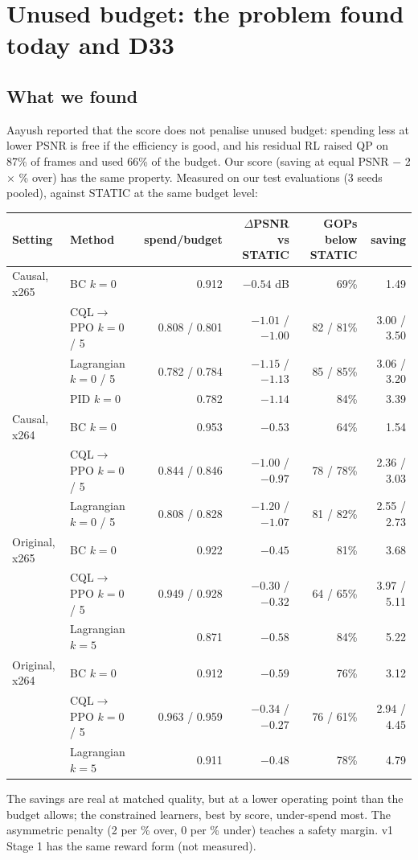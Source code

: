 \documentclass[10pt,a4paper]{article}
\begin{document}
\section{Unused budget: the problem found today and D33}\label{sec:under}
\subsection{What we found}
Aayush reported that the score does not penalise unused budget: spending less at lower PSNR is free if the
efficiency is good, and his residual RL raised QP on 87\% of frames and used 66\% of the budget. Our score (saving at
equal PSNR $-$ 2 $\times$ \% over) has the same property. Measured on our test evaluations (3 seeds pooled),
against STATIC at the same budget level:
\begin{center}\small
\begin{tabular}{llrrrr}
\toprule
Setting & Method & spend/budget & $\Delta$PSNR vs STATIC & GOPs below STATIC & saving \\\midrule
Causal, x265 & BC $k=0$ & 0.912 & $-0.54$ dB & 69\% & 1.49 \\
& CQL$\to$PPO $k=0$ / 5 & 0.808 / 0.801 & $-1.01$ / $-1.00$ & 82 / 81\% & 3.00 / 3.50 \\
& Lagrangian $k=0$ / 5 & 0.782 / 0.784 & $-1.15$ / $-1.13$ & 85 / 85\% & 3.06 / 3.20 \\
& PID $k=0$ & 0.782 & $-1.14$ & 84\% & 3.39 \\
Causal, x264 & BC $k=0$ & 0.953 & $-0.53$ & 64\% & 1.54 \\
& CQL$\to$PPO $k=0$ / 5 & 0.844 / 0.846 & $-1.00$ / $-0.97$ & 78 / 78\% & 2.36 / 3.03 \\
& Lagrangian $k=0$ / 5 & 0.808 / 0.828 & $-1.20$ / $-1.07$ & 81 / 82\% & 2.55 / 2.73 \\
Original, x265 & BC $k=0$ & 0.922 & $-0.45$ & 81\% & 3.68 \\
& CQL$\to$PPO $k=0$ / 5 & 0.949 / 0.928 & $-0.30$ / $-0.32$ & 64 / 65\% & 3.97 / 5.11 \\
& Lagrangian $k=5$ & 0.871 & $-0.58$ & 84\% & 5.22 \\
Original, x264 & BC $k=0$ & 0.912 & $-0.59$ & 76\% & 3.12 \\
& CQL$\to$PPO $k=0$ / 5 & 0.963 / 0.959 & $-0.34$ / $-0.27$ & 76 / 61\% & 2.94 / 4.45 \\
& Lagrangian $k=5$ & 0.911 & $-0.48$ & 78\% & 4.79 \\
\bottomrule
\end{tabular}
\end{center}
The savings are real at matched quality, but at a lower operating point than the budget allows; the constrained
learners, best by score, under-spend most. The asymmetric penalty (2 per \% over, 0 per \% under) teaches a safety
margin. v1 Stage 1 has the same reward form (not measured).
\end{document}
